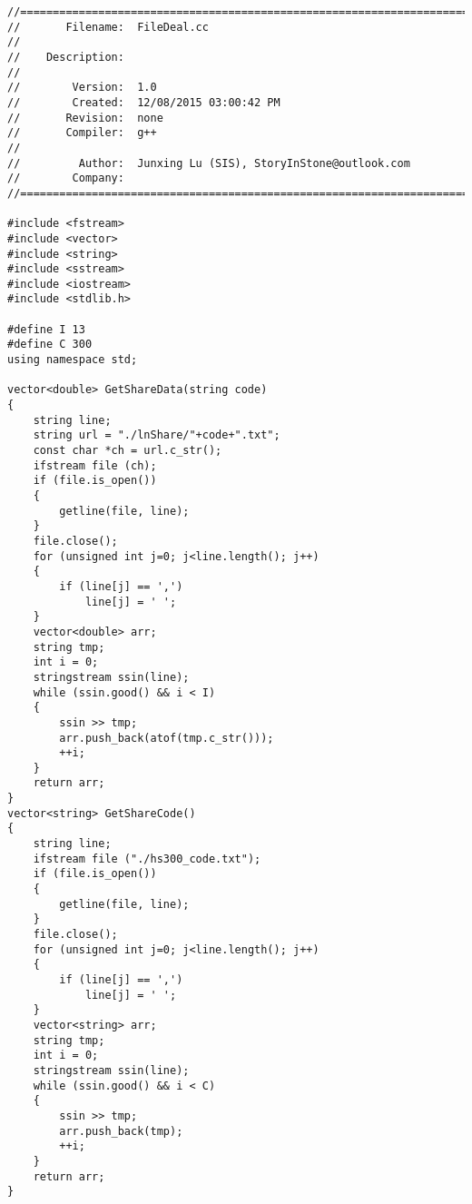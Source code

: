\begin{lstlisting}[caption={FileDeal.cc},label=FileDeal]
//=======================================================================
//       Filename:  FileDeal.cc
// 
//    Description:  
// 
//        Version:  1.0
//        Created:  12/08/2015 03:00:42 PM
//       Revision:  none
//       Compiler:  g++
// 
//         Author:  Junxing Lu (SIS), StoryInStone@outlook.com
//        Company:  
//=======================================================================

#include <fstream>
#include <vector>
#include <string>
#include <sstream>
#include <iostream>
#include <stdlib.h>

#define I 13
#define C 300
using namespace std;

vector<double> GetShareData(string code)
{
    string line;
    string url = "./lnShare/"+code+".txt";
    const char *ch = url.c_str();
    ifstream file (ch);
    if (file.is_open())
    {
        getline(file, line);
    }
    file.close();
    for (unsigned int j=0; j<line.length(); j++)
    {
        if (line[j] == ',')
            line[j] = ' ';
    }
    vector<double> arr;
    string tmp;
    int i = 0;
    stringstream ssin(line);
    while (ssin.good() && i < I)
    {
        ssin >> tmp;
        arr.push_back(atof(tmp.c_str()));
        ++i;
    }
    return arr;
}
vector<string> GetShareCode()
{
    string line;
    ifstream file ("./hs300_code.txt");
    if (file.is_open())
    {
        getline(file, line);
    }
    file.close();
    for (unsigned int j=0; j<line.length(); j++)
    {
        if (line[j] == ',')
            line[j] = ' ';
    }
    vector<string> arr;
    string tmp;
    int i = 0;
    stringstream ssin(line);
    while (ssin.good() && i < C)
    {
        ssin >> tmp;
        arr.push_back(tmp);
        ++i;
    }
    return arr;
}
\end{lstlisting}
\newpage

